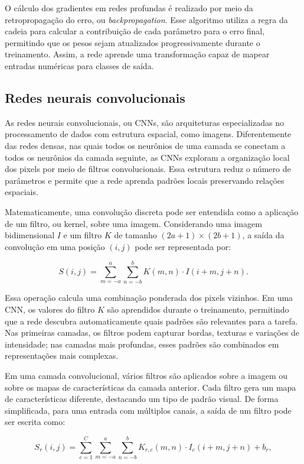 \documentclass[
    12pt,
    openright,
    oneside,
    a4paper,
    english,
    brazil
]{abntex2}
\begin{document}
O cálculo dos gradientes em redes profundas é realizado por meio da retropropagação do erro, ou \textit{backpropagation}. Esse algoritmo utiliza a regra da cadeia para calcular a contribuição de cada parâmetro para o erro final, permitindo que os pesos sejam atualizados progressivamente durante o treinamento. Assim, a rede aprende uma transformação capaz de mapear entradas numéricas para classes de saída.

\subsection{Redes neurais convolucionais}

As redes neurais convolucionais, ou CNNs, são arquiteturas especializadas no processamento de dados com estrutura espacial, como imagens. Diferentemente das redes densas, nas quais todos os neurônios de uma camada se conectam a todos os neurônios da camada seguinte, as CNNs exploram a organização local dos pixels por meio de filtros convolucionais. Essa estrutura reduz o número de parâmetros e permite que a rede aprenda padrões locais preservando relações espaciais.

Matematicamente, uma convolução discreta pode ser entendida como a aplicação de um filtro, ou kernel, sobre uma imagem. Considerando uma imagem bidimensional \(I\) e um filtro \(K\) de tamanho \((2a+1) \times (2b+1)\), a saída da convolução em uma posição \((i,j)\) pode ser representada por:

\[
S(i,j) =
\sum_{m=-a}^{a}
\sum_{n=-b}^{b}
K(m,n)\cdot I(i+m,j+n).
\]

Essa operação calcula uma combinação ponderada dos pixels vizinhos. Em uma CNN, os valores do filtro \(K\) são aprendidos durante o treinamento, permitindo que a rede descubra automaticamente quais padrões são relevantes para a tarefa. Nas primeiras camadas, os filtros podem capturar bordas, texturas e variações de intensidade; nas camadas mais profundas, esses padrões são combinados em representações mais complexas.

Em uma camada convolucional, vários filtros são aplicados sobre a imagem ou sobre os mapas de características da camada anterior. Cada filtro gera um mapa de características diferente, destacando um tipo de padrão visual. De forma simplificada, para uma entrada com múltiplos canais, a saída de um filtro pode ser escrita como:

\[
S_r(i,j) =
\sum_{c=1}^{C}
\sum_{m=-a}^{a}
\sum_{n=-b}^{b}
K_{r,c}(m,n)\cdot I_c(i+m,j+n) + b_r,
\]
\end{document}

